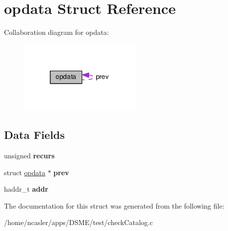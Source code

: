 \hypertarget{structopdata}{}\section{opdata Struct Reference}
\label{structopdata}


Collaboration diagram for opdata\+:\nopagebreak
\begin{figure}[H]
\begin{center}
\leavevmode
\includegraphics[width=169pt]{da/ddf/structopdata__coll__graph}
\end{center}
\end{figure}
\subsection*{Data Fields}
\begin{DoxyCompactItemize}
\item 
\hypertarget{structopdata_a45e0f6b082939684945a016bbc053507}{}unsigned {\bfseries recurs}\label{structopdata_a45e0f6b082939684945a016bbc053507}

\item 
\hypertarget{structopdata_aca5c8fc54f3ee06a51eb3f9e40ce4b7f}{}struct \hyperlink{structopdata}{opdata} $\ast$ {\bfseries prev}\label{structopdata_aca5c8fc54f3ee06a51eb3f9e40ce4b7f}

\item 
\hypertarget{structopdata_a12e1bf828a0cb70253d508355a825512}{}haddr\+\_\+t {\bfseries addr}\label{structopdata_a12e1bf828a0cb70253d508355a825512}

\end{DoxyCompactItemize}


The documentation for this struct was generated from the following file\+:\begin{DoxyCompactItemize}
\item 
/home/ncasler/apps/\+D\+S\+M\+E/test/check\+Catalog.\+c\end{DoxyCompactItemize}

